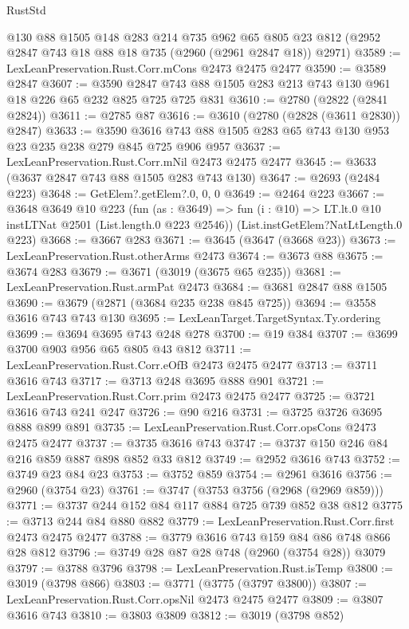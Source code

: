 \begin{lexlean}{RustStd}
\begin{coremodule}
    @130
    @88
    @1505
    @148
    @283
    @214
    @735
    @962
    @65
    @805
    @23
    @812
    (@2952 @2847 @743 @18 @88 @18 @735 (@2960 (@2961 @2847 @18)) @2971)
@3589 := LexLeanPreservation.Rust.Corr.mCons @2473 @2475 @2477
@3590 := @3589 @2847
@3607 := @3590 @2847 @743 @88 @1505 @283 @213 @743 @130 @961 @18 @226 @65 @232 @825 @725 @725 @831
@3610 := @2780 (@2822 (@2841 @2824))
@3611 := @2785 @87
@3616 := @3610 (@2780 (@2828 (@3611 @2830)) @2847)
@3633 := @3590 @3616 @743 @88 @1505 @283 @65 @743 @130 @953 @23 @235 @238 @279 @845 @725 @906 @957
@3637 := LexLeanPreservation.Rust.Corr.mNil @2473 @2475 @2477
@3645 := @3633 (@3637 @2847 @743 @88 @1505 @283 @743 @130)
@3647 := @2693 (@2484 @223)
@3648 := GetElem?.getElem?.{0, 0, 0}
@3649 := @2464 @223
@3667 := @3648
    @3649
    @10
    @223
    (fun (as : @3649) =>
    fun (i : @10) => LT.lt.{0} @10 instLTNat @2501 (List.length.{0} @223 @2546))
    (List.instGetElem?NatLtLength.{0} @223)
@3668 := @3667 @283
@3671 := @3645 (@3647 (@3668 @23))
@3673 := LexLeanPreservation.Rust.otherArms @2473
@3674 := @3673 @88
@3675 := @3674 @283
@3679 := @3671 (@3019 (@3675 @65 @235))
@3681 := LexLeanPreservation.Rust.armPat @2473
@3684 := @3681 @2847 @88 @1505
@3690 := @3679 (@2871 (@3684 @235 @238 @845 @725))
@3694 := @3558 @3616 @743 @743 @130
@3695 := LexLeanTarget.TargetSyntax.Ty.ordering
@3699 := @3694 @3695 @743 @248 @278
@3700 := @19 @384
@3707 := @3699 @3700 @903 @956 @65 @805 @43 @812
@3711 := LexLeanPreservation.Rust.Corr.eOfB @2473 @2475 @2477
@3713 := @3711 @3616 @743
@3717 := @3713 @248 @3695 @888 @901
@3721 := LexLeanPreservation.Rust.Corr.prim @2473 @2475 @2477
@3725 := @3721 @3616 @743 @241 @247
@3726 := @90 @216
@3731 := @3725 @3726 @3695 @888 @899 @891
@3735 := LexLeanPreservation.Rust.Corr.opsCons @2473 @2475 @2477
@3737 := @3735 @3616 @743
@3747 := @3737 @150 @246 @84 @216 @859 @887 @898 @852 @33 @812
@3749 := @2952 @3616 @743
@3752 := @3749 @23 @84 @23
@3753 := @3752 @859
@3754 := @2961 @3616
@3756 := @2960 (@3754 @23)
@3761 := @3747 (@3753 @3756 (@2968 (@2969 @859)))
@3771 := @3737 @244 @152 @84 @117 @884 @725 @739 @852 @38 @812
@3775 := @3713 @244 @84 @880 @882
@3779 := LexLeanPreservation.Rust.Corr.first @2473 @2475 @2477
@3788 := @3779 @3616 @743 @159 @84 @86 @748 @866 @28 @812
@3796 := @3749 @28 @87 @28 @748 (@2960 (@3754 @28)) @3079
@3797 := @3788 @3796
@3798 := LexLeanPreservation.Rust.isTemp
@3800 := @3019 (@3798 @866)
@3803 := @3771 (@3775 (@3797 @3800))
@3807 := LexLeanPreservation.Rust.Corr.opsNil @2473 @2475 @2477
@3809 := @3807 @3616 @743
@3810 := @3803 @3809
@3812 := @3019 (@3798 @852)

\end{coremodule}
\end{lexlean}
